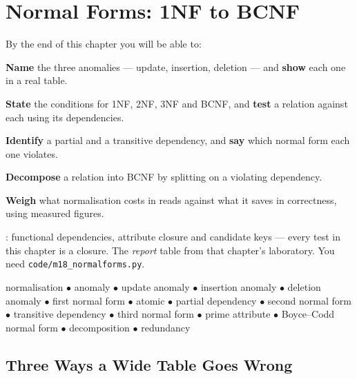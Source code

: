 \chapter{Normal Forms: 1NF to BCNF}\label{ch:normalforms}

\begin{outcomes}
By the end of this chapter you will be able to:
\begin{tight}
  \item \textbf{Name} the three anomalies --- update, insertion, deletion ---
        and \textbf{show} each one in a real table.
  \item \textbf{State} the conditions for 1NF, 2NF, 3NF and BCNF, and
        \textbf{test} a relation against each using its dependencies.
  \item \textbf{Identify} a partial and a transitive dependency, and
        \textbf{say} which normal form each one violates.
  \item \textbf{Decompose} a relation into BCNF by splitting on a violating
        dependency.
  \item \textbf{Weigh} what normalisation costs in reads against what it saves
        in correctness, using measured figures.
\end{tight}
\end{outcomes}

\begin{prereq}
: functional dependencies, attribute closure and candidate keys ---
every test in this chapter is a closure. The \textit{report} table from that
chapter's laboratory. You need \texttt{code/m18\_normalforms.py}.
\end{prereq}

\begin{keyterms}
normalisation $\bullet$ anomaly $\bullet$ update anomaly $\bullet$ insertion
anomaly $\bullet$ deletion anomaly $\bullet$ first normal form $\bullet$
atomic $\bullet$ partial dependency $\bullet$ second normal form $\bullet$
transitive dependency $\bullet$ third normal form $\bullet$ prime attribute
$\bullet$ Boyce--Codd normal form $\bullet$ decomposition $\bullet$ redundancy
\end{keyterms}

\section{Three Ways a Wide Table Goes Wrong}

